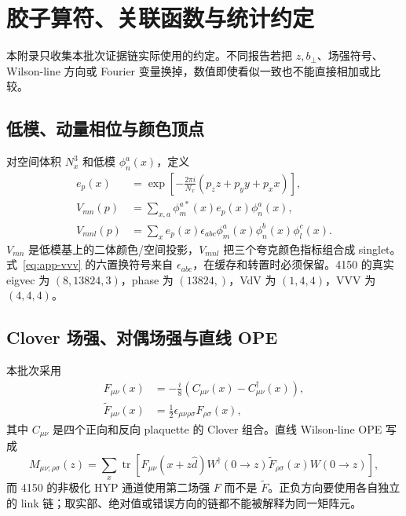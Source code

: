 \chapter{胶子算符、关联函数与统计约定}\label{app:b09-conventions}
本附录只收集本批次证据链实际使用的约定。不同报告若把 \(z,b_\perp\)、场强符号、Wilson-line 方向或 Fourier 变量换掉，数值即使看似一致也不能直接相加或比较。

\section{低模、动量相位与颜色顶点}
\label{app:b09-vertices}

对空间体积 \(N_x^3\) 和低模 \(\phi_n^a(x)\)，定义
\begin{align}
  e_p(x)&=\exp\left[-\frac{2\pi i}{N_x}
  \left(p_zz+p_yy+p_xx\right)\right],
  \label{eq:app-phase}\\
  V_{mn}(p)&=\sum_{x,a}\phi_m^{a*}(x)e_p(x)\phi_n^a(x),
  \label{eq:app-vdv}\\
  V_{mnl}(p)&=\sum_x e_p(x)\epsilon_{abc}
  \phi_m^a(x)\phi_n^b(x)\phi_l^c(x).
  \label{eq:app-vvv}
\end{align}
\(V_{mn}\) 是低模基上的二体颜色/空间投影，\(V_{mnl}\) 把三个夸克颜色指标组合成 singlet。式~\eqref{eq:app-vvv} 的六置换符号来自 \(\epsilon_{abc}\)，在缓存和转置时必须保留。4150 的真实 eigvec 为 \((8,13824,3)\)，phase 为 \((13824,)\)，VdV 为 \((1,4,4)\)，VVV 为 \((4,4,4)\)。

\section{Clover 场强、对偶场强与直线 OPE}
\label{app:b09-field-strength}

本批次采用
\begin{align}
  F_{\mu\nu}(x)&=-\frac{i}{8}
  \left(C_{\mu\nu}(x)-C_{\mu\nu}^\dagger(x)\right),
  \label{eq:app-clover}\\
  \widetilde F_{\mu\nu}(x)&=\frac12
  \epsilon_{\mu\nu\rho\sigma}F_{\rho\sigma}(x),
  \label{eq:app-dual}
\end{align}
其中 \(C_{\mu\nu}\) 是四个正向和反向 plaquette 的 Clover 组合。直线 Wilson-line OPE 写成
\begin{equation}
  M_{\mu\nu;\rho\sigma}(z)=
  \sum_x\operatorname{tr}\left[
  F_{\mu\nu}(x+z\hat d)W^\dagger(0\to z)
  \widetilde F_{\rho\sigma}(x)W(0\to z)\right],
  \label{eq:app-line-ope}
\end{equation}
而 4150 的非极化 HYP 通道使用第二场强 \(F\) 而不是 \(\widetilde F\)。正负方向要使用各自独立的 link 链；取实部、绝对值或错误方向的链都不能被解释为同一矩阵元。

